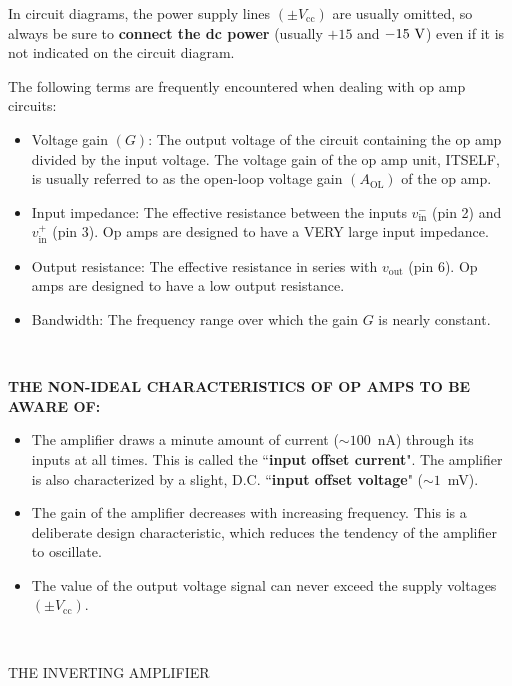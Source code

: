 \documentclass[12pt,oneside,openany,letterpaper]{article}
\begin{document}
\noindent In circuit diagrams, the power supply lines $(\pm V_\mathrm{cc})$ are usually omitted, so always be sure to {\bf connect the dc power} (usually $+15$ and $-15\rm\ V$) even if it is not indicated on the circuit diagram. 

\clearpage

The following terms are frequently encountered when dealing with op amp circuits:
\begin{itemize}
\item Voltage gain $(G)$:  The output voltage of the circuit containing the op amp divided by the input voltage.  The voltage gain of the op amp unit, ITSELF, is usually referred to as the open-loop voltage gain $(A_\mathrm{OL})$ of the op amp. 
\item Input impedance: The effective resistance between the inputs $v_\mathrm{in}^-$ (pin 2) and $v_\mathrm{in}^+$ (pin 3).  Op amps are designed to have a VERY large input impedance. 
\item Output resistance: The effective resistance in series with $v_\mathrm{out}$ (pin 6).  Op amps are designed to have a low output resistance. 
\item	Bandwidth: The frequency range over which the gain $G$ is nearly constant. 
\end{itemize}

~

{\bf THE NON-IDEAL CHARACTERISTICS OF OP AMPS TO BE AWARE OF:}
\begin{itemize}
\item The amplifier draws a minute amount of current ($\sim 100$~nA) through its inputs at all times.  This is called the ``{\bf input offset current}".  The amplifier is also characterized by a slight, D.C. ``{\bf input offset voltage}" ($\sim 1$~mV). 
\item The gain of the amplifier decreases with increasing frequency. This is a deliberate design characteristic, which reduces the tendency of the amplifier to oscillate. 
\item The value of the output voltage signal can never exceed the supply voltages $(\pm V_\mathrm{cc})$.
\end{itemize}

~

\noindent THE INVERTING AMPLIFIER

~
\end{document}
